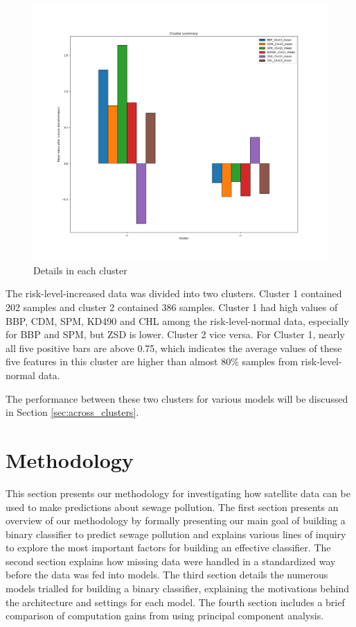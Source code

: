 \documentclass[a4paper,11pt]{report}
\begin{document}
\begin{figure}[H]
\begin{center}
\includegraphics[width=1\linewidth, height=0.45\textheight]{images/Kmeans_cluster_detail.png}
\caption{Details in each cluster}
\label{fig:cluster_details}
\end{center}
\end{figure}

The risk-level-increased data was divided into two clusters. Cluster 1 contained 202 samples and cluster 2 contained 386 samples. Cluster 1 had high values of BBP, CDM, SPM, KD490 and CHL among the risk-level-normal data, especially for BBP and SPM, but ZSD is lower. Cluster 2 vice versa. For Cluster 1, nearly all five positive bars are above 0.75, which indicates the average values of these five features in this cluster are higher than almost 80\% samples from risk-level-normal data.

The performance between these two clusters for various models will be discussed in Section \ref{sec:across_clusters}.


\chapter{Methodology}

This section presents our methodology for investigating how satellite data can be used to make predictions about sewage pollution. The first section presents an overview of our methodology by formally presenting our main goal of building a binary classifier to predict sewage pollution and explains various lines of inquiry to explore the most important factors for building an effective classifier. The second section explains how missing data were handled in a standardized way before the data was fed into models. The third section details the numerous models trialled for building a binary classifier, explaining the motivations behind the architecture and settings for each model. The fourth section includes a brief comparison of computation gains from using principal component analysis. 
\end{document}
